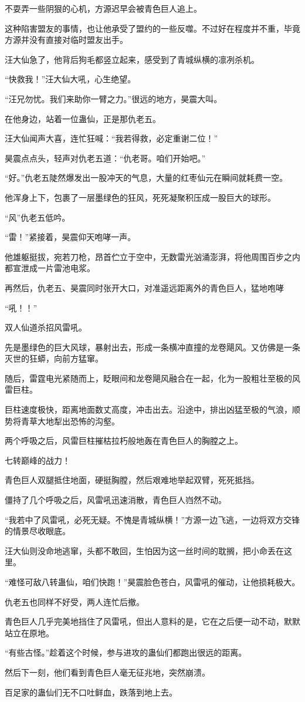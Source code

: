 \begin{this_body}
不耍弄一些阴狠的心机，方源迟早会被青色巨人追上。

这种陷害盟友的事情，也让他承受了盟约的一些反噬。不过好在程度并不重，毕竟方源并没有直接对临时盟友出手。

汪大仙急了，他背后狗毛都竖立起来，感受到了青城纵横的凛冽杀机。

“快救我！”汪大仙大吼，心生绝望。

“汪兄勿忧。我们来助你一臂之力。”很远的地方，昊震大叫。

在他身边，站着一位蛊仙，正是那仇老五。

汪大仙闻声大喜，连忙狂喊：“我若得救，必定重谢二位！”

昊震点点头，轻声对仇老五道：“仇老哥。咱们开始吧。”

“好。”仇老五陡然爆发出一股冲天的气息，大量的红枣仙元在瞬间就耗费一空。

他浑身上下，包裹了一层墨绿色的狂风，死死凝聚积压成一股巨大的球形。

“风”仇老五低吟。

“雷！”紧接着，昊震仰天咆哮一声。

他雄躯挺拔，宛若刀枪，昂首伫立于空中，无数雷光汹涌澎湃，将他周围百步之内都宣泄成一片雷池电浆。

再然后，仇老五、昊震同时张开大口，对准遥远距离外的青色巨人，猛地咆哮

“吼！！”

双人仙道杀招风雷吼。

先是墨绿色的巨大风球，暴射出去，形成一条横冲直撞的龙卷飓风。又仿佛是一条灭世的狂蟒，向前方猛窜。

随后，雷霆电光紧随而上，眨眼间和龙卷飓风融合在一起，化为一股粗壮至极的风雷巨柱。

巨柱速度极快，距离地面数丈高度，冲击出去。沿途中，排出凶猛至极的气浪，顺势将青草大地犁出恐怖的沟壑。

两个呼吸之后，风雷巨柱摧枯拉朽般地轰在青色巨人的胸膛之上。

七转巅峰的战力！

青色巨人双腿抵住地面，硬挺胸膛，然后艰难地举起双臂，死死抵挡。

僵持了几个呼吸之后，风雷吼迅速消散，青色巨人岿然不动。

“我若中了风雷吼，必死无疑。不愧是青城纵横！”方源一边飞逃，一边将双方交锋的情景尽收眼底。

汪大仙则没命地逃窜，头都不敢回，生怕因为这一丝时间的耽搁，把小命丢在这里。

“难怪可敌八转蛊仙，咱们快跑！”昊震脸色苍白，风雷吼的催动，让他损耗极大。

仇老五也同样不好受，两人连忙后撤。

青色巨人几乎完美地挡住了风雷吼，但出人意料的是，它在之后便一动不动，默默站立在原地。

“有些古怪。”趁着这个时候，参与进攻的蛊仙们都跑出很远的距离。

然后下一刻，他们看到青色巨人毫无征兆地，突然崩溃。

百足家的蛊仙们无不口吐鲜血，跌落到地上去。

\end{this_body}

